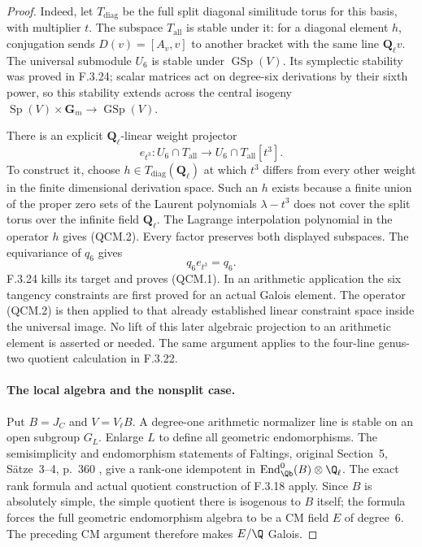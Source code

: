 \begin{proof}
Indeed, let $T_{\mathrm{diag}}$ be the full split diagonal
similitude torus for this basis, with multiplier $t$. The
subspace $T_{\mathrm{all}}$ is stable under it: for a diagonal
element $h$, conjugation sends $D(v)=[A_v,v]$ to another
bracket with the same line $\mathbf Q_\ell v$. The universal
submodule $U_6$ is stable under $\operatorname{GSp}(V)$.
Its symplectic stability was proved in F.3.24; scalar matrices
act on degree-six derivations by their sixth power, so this
stability extends across the central isogeny
$\operatorname{Sp}(V)\times\mathbf G_m\to\operatorname{GSp}(V)$.

There is an explicit $\mathbf Q_\ell$-linear weight projector
\[
 e_{t^3}:U_6\cap T_{\mathrm{all}}
       \longrightarrow U_6\cap T_{\mathrm{all}}[t^3].          \tag{QCM.2}
\]
To construct it, choose $h\in T_{\mathrm{diag}}(\mathbf Q_\ell)$
at which $t^3$ differs from every other weight in the finite
dimensional derivation space. Such an $h$ exists because a
finite union of the proper zero sets of the Laurent
polynomials $\lambda-t^3$ does not cover the split torus
over the infinite field $\mathbf Q_\ell$. The Lagrange
interpolation polynomial in the operator $h$ gives (QCM.2).
Every factor preserves both displayed subspaces. The
equivariance of $q_6$ gives
\[
                              q_6 e_{t^3}=q_6.
\]
F.3.24 kills its target and proves (QCM.1).
In an arithmetic application the six tangency constraints
are first proved for an actual Galois element. The operator
(QCM.2) is then applied to that already established linear
constraint space inside the universal image. No lift of
this later algebraic projection to an arithmetic element
is asserted or needed. The same argument applies to the
four-line genus-two quotient calculation in F.3.22.



\paragraph{The local algebra and the nonsplit case.}
Put $B=J_C$ and $V=V_\ell B$. A degree-one arithmetic
normalizer line is stable on an open subgroup $G_L$.
Enlarge $L$ to define all geometric endomorphisms.
The semisimplicity and endomorphism statements of
Faltings, original Section~5, S\"atze~3--4, p.~360
\cite{GenFaltings1983}, give a rank-one idempotent
in $\operatorname{End}^0_{\Qb}(B)\otimes\Q_\ell$.
The exact rank formula and actual quotient construction
of F.3.18 apply. Since $B$ is absolutely simple, the
simple quotient there is isogenous to $B$ itself;
the formula forces the full geometric endomorphism
algebra to be a CM field $E$ of degree~6. The preceding
CM argument therefore makes $E/\Q$ Galois.


\end{proof}
